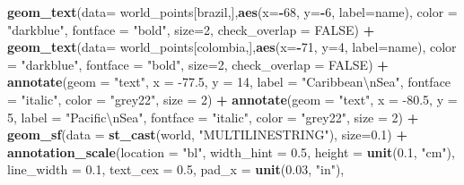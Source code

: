 \documentclass[12pt,oneside]{reedthesis}
\newenvironment{Shaded}{\begin{snugshade}}{\end{snugshade}}
\newcommand{\CharTok}[1]{\textcolor[rgb]{0.31,0.60,0.02}{#1}}
\newcommand{\DataTypeTok}[1]{\textcolor[rgb]{0.13,0.29,0.53}{#1}}
\newcommand{\DecValTok}[1]{\textcolor[rgb]{0.00,0.00,0.81}{#1}}
\newcommand{\FloatTok}[1]{\textcolor[rgb]{0.00,0.00,0.81}{#1}}
\newcommand{\KeywordTok}[1]{\textcolor[rgb]{0.13,0.29,0.53}{\textbf{#1}}}
\newcommand{\NormalTok}[1]{#1}
\newcommand{\OperatorTok}[1]{\textcolor[rgb]{0.81,0.36,0.00}{\textbf{#1}}}
\newcommand{\OtherTok}[1]{\textcolor[rgb]{0.56,0.35,0.01}{#1}}
\newcommand{\StringTok}[1]{\textcolor[rgb]{0.31,0.60,0.02}{#1}}
\begin{document}
\begin{Shaded}
\begin{Highlighting}[]
\StringTok{  }\KeywordTok{geom_text}\NormalTok{(}\DataTypeTok{data=}\NormalTok{ world_points[brazil,],}\KeywordTok{aes}\NormalTok{(}\DataTypeTok{x=}\OperatorTok{-}\DecValTok{68}\NormalTok{, }\DataTypeTok{y=}\OperatorTok{-}\DecValTok{6}\NormalTok{, }\DataTypeTok{label=}\NormalTok{name), }\DataTypeTok{color =} \StringTok{"darkblue"}\NormalTok{, }\DataTypeTok{fontface =} \StringTok{"bold"}\NormalTok{, }\DataTypeTok{size=}\DecValTok{2}\NormalTok{, }\DataTypeTok{check_overlap =} \OtherTok{FALSE}\NormalTok{) }\OperatorTok{+}
\StringTok{  }\KeywordTok{geom_text}\NormalTok{(}\DataTypeTok{data=}\NormalTok{ world_points[colombia,],}\KeywordTok{aes}\NormalTok{(}\DataTypeTok{x=}\OperatorTok{-}\DecValTok{71}\NormalTok{, }\DataTypeTok{y=}\DecValTok{4}\NormalTok{, }\DataTypeTok{label=}\NormalTok{name), }\DataTypeTok{color =} \StringTok{"darkblue"}\NormalTok{, }\DataTypeTok{fontface =} \StringTok{"bold"}\NormalTok{, }\DataTypeTok{size=}\DecValTok{2}\NormalTok{, }\DataTypeTok{check_overlap =} \OtherTok{FALSE}\NormalTok{) }\OperatorTok{+}
\StringTok{  }\KeywordTok{annotate}\NormalTok{(}\DataTypeTok{geom =} \StringTok{"text"}\NormalTok{, }\DataTypeTok{x =} \FloatTok{-77.5}\NormalTok{, }\DataTypeTok{y =} \DecValTok{14}\NormalTok{, }\DataTypeTok{label =} \StringTok{"Caribbean}\CharTok{\textbackslash{}n}\StringTok{Sea"}\NormalTok{, }\DataTypeTok{fontface =} \StringTok{"italic"}\NormalTok{, }\DataTypeTok{color =} \StringTok{"grey22"}\NormalTok{, }\DataTypeTok{size =} \DecValTok{2}\NormalTok{) }\OperatorTok{+}\StringTok{ }
\StringTok{  }\KeywordTok{annotate}\NormalTok{(}\DataTypeTok{geom =} \StringTok{"text"}\NormalTok{, }\DataTypeTok{x =} \FloatTok{-80.5}\NormalTok{, }\DataTypeTok{y =} \DecValTok{5}\NormalTok{, }\DataTypeTok{label =} \StringTok{"Pacific}\CharTok{\textbackslash{}n}\StringTok{Sea"}\NormalTok{, }\DataTypeTok{fontface =} \StringTok{"italic"}\NormalTok{, }\DataTypeTok{color =} \StringTok{"grey22"}\NormalTok{, }\DataTypeTok{size =} \DecValTok{2}\NormalTok{) }\OperatorTok{+}
\StringTok{  }\KeywordTok{geom_sf}\NormalTok{(}\DataTypeTok{data =} \KeywordTok{st_cast}\NormalTok{(world, }\StringTok{"MULTILINESTRING"}\NormalTok{), }\DataTypeTok{size=}\FloatTok{0.1}\NormalTok{) }\OperatorTok{+}
\StringTok{  }\KeywordTok{annotation_scale}\NormalTok{(}\DataTypeTok{location =} \StringTok{"bl"}\NormalTok{, }\DataTypeTok{width_hint =} \FloatTok{0.5}\NormalTok{, }\DataTypeTok{height =} \KeywordTok{unit}\NormalTok{(}\FloatTok{0.1}\NormalTok{, }\StringTok{"cm"}\NormalTok{), }\DataTypeTok{line_width =} \FloatTok{0.1}\NormalTok{, }\DataTypeTok{text_cex =} \FloatTok{0.5}\NormalTok{, }\DataTypeTok{pad_x =} \KeywordTok{unit}\NormalTok{(}\FloatTok{0.03}\NormalTok{, }\StringTok{"in"}\NormalTok{), }

\end{Highlighting}
\end{Shaded}
\end{document}

